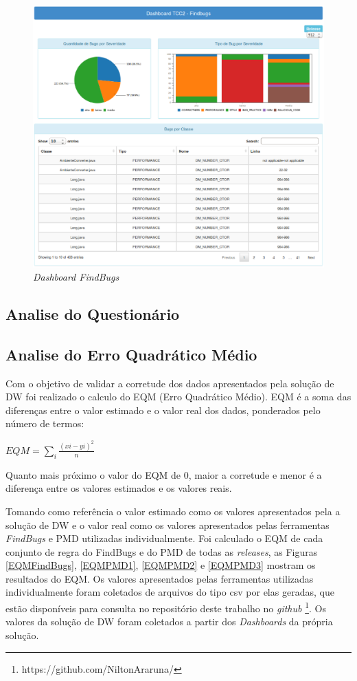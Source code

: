 \begin{figure}[h!]
\centering
\includegraphics[keepaspectratio=false,scale=0.5]{figuras/figuras_nilton/DashboardFindbugs.eps}
\caption{\textit{Dashboard FindBugs}}
\label{dashboardCenarios}
\end{figure}

\subsection{Analise do Questionário}



\subsection{Analise do Erro Quadrático Médio}

Com o objetivo de validar a corretude dos dados apresentados pela solução de DW foi realizado o calculo do EQM (Erro Quadrático Médio). EQM é a soma das diferenças entre
o valor estimado e o valor real dos dados, ponderados pelo número de termos: 

$ EQM = \sum\limits_{i}\frac{(x{i}-y{i})^{2}}{n} $

Quanto mais próximo o valor do EQM de 0, maior a corretude e menor é a diferença entre os valores estimados e os valores reais.

Tomando como referência o valor estimado como os valores apresentados pela a solução de DW e o valor real como os valores apresentados pelas ferramentas \textit{FindBugs} e PMD utilizadas individualmente. Foi calculado o EQM de cada conjunto de regra do FindBugs e do PMD de todas as \textit{releases}, as Figuras \ref{EQMFindBugs}, \ref{EQMPMD1}, \ref{EQMPMD2} e \ref{EQMPMD3} mostram os resultados do EQM. Os valores apresentados pelas ferramentas utilizadas individualmente foram coletados de arquivos do tipo csv por elas geradas, que estão disponíveis para consulta no repositório deste trabalho no \textit{github} \footnote{https://github.com/NiltonAraruna/}. Os valores da solução de DW foram coletados a partir dos \textit{Dashboards} da própria solução.


